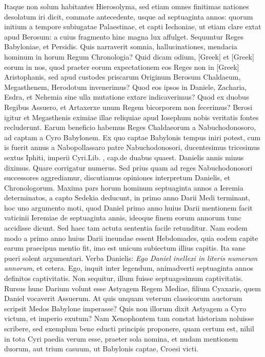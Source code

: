 Itaque non solum
habitantes Hierosolyma, sed etiam omnes finitimas nationes desolatum
iri dicit, commate antecedente, usque ad septuaginta annos:
quorum initium a tempore subiugatae Palaestinae, et capti Iechoniae,
ut etiam clare extat apud Berosum: a cuius fragmento hinc
magna lux affulget.
Sequuntur Reges Babyloniae, et Persidis.
Quis narraverit somnia, hallucinationes, mendacia hominum in horum
Regum Chronologia?
Quid dicam odium, \textgreek{[Greek]} et \textgreek{[Greek]}
eorum in nos, quod praeter eorum expectationem eos Reges non
in \textgreek{[Greek]} Aristophanis, sed apud custodes priscarum Originum
Berosum Chaldaeum, Megasthenem, Herodotum invenerimus?
Quod eos ipsos in Daniele, Zacharia, Esdra, et Nehemia sine
ulla mutatione extare indicaverimus?
Quod ex duobus Regibus
Assuero, et Artaxerxe unum Regem bicorporem non fecerimus?
Berosi igitur et Megasthenis eximiae illae reliquiae apud Iosephum
nobis veritatis fontes recluderunt.
Earum beneficio habemus Reges
Chaldaeorum a Nabuchodonosoro, ad captam a Cyro Babylonem.
Ex quo captae Babylonis tempus iniri potest, cum is fuerit annus
 a Nabopollassaro patre Nabuchodonosori, ducentesimus
tricesimus sextus Iphiti,
  imperii Cyri.Lib. , cap.de duabus
quaest.
Danielis  annis minus diximus.
Quare corrigatur
numerus.
Sed prius quam ad reges Nabuchodonosori successores aggrediamur,
discutiamus opiniones interpretum Danielis, et Chronologorum.
Maxima pars horum hominum septuaginta annos a
Ieremia determinatos, a capto Sedekia deducunt, in primo anno
Darii Medi terminant, hoc uno argumento moti, quod Daniel primo
anno huius Darii mentionem facit vaticinii Ieremiae de septuaginta
annis, ideoque finem eorum annorum tunc accidisse dicunt.
Sed haec tam actuta sententia facile retunditur.
Nam eodem modo
a primo anno huius Darii ineundae essent Hebdomades, quia eodem
capite earum praecipua mentio fit, imo est unicum subiectum illius
capitis.
Ita sane pueri solent argumentari.
Verba Danielis: \textit{Ego
Daniel inellexi in literis numerum annorum}, et cetera.
Ego, inquit inter
legendum, animadverti septuaginta annos definitos captivitatis.
Non sequitur, illum fuisse septuagesimum captivitatis.
Rursus hunc
Darium volunt esse Astyagem Regem Mediae, filium Cyaxaris,
quem Daniel vocaverit Assuerum.
At quis unquam veterum classicorum
auctorum scripsit Medos Babylone imperasse?
Quis non
illorum dixit Astyagem a Cyro victum, et imperio exutum?
Nam Xenophontem tam constat historiam noluisse scribere, sed exemplum
bene educti principis proponere, quam certum est, nihil in tota Cyri
paedia verum esse, praeter sola nomina, et nudam mentionem duorum,
aut trium casuum, ut Babylonis captae, Croesi victi.


